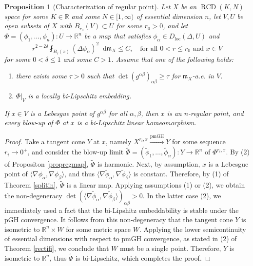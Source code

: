\documentclass[11pt,reqno]{amsart}
\newtheorem{proposition}[theorem]{Proposition}
\theoremstyle{definition}
\numberwithin{equation}{section}
\newcommand{\di}{\mathop{}\!\mathrm{d}}
\newcommand{\meas}{\mathfrak{m}}
\DeclareMathOperator{\loc}{loc}
\DeclareMathOperator{\RCD}{RCD}
\begin{document}
\begin{proposition}[Characterization of regular point]\label{regularpointch}
Let $X$ be an $\RCD(K, N)$ space for some $K \in \mathbb{R}$ and some $N \in [1,\infty)$ of essential dimension $n$, let $V, U$ be open subsets of $X$ with $B_{r_0}(V) \subset U$ for some $r_0>0$, 
and let $\Phi=(\phi_1, \ldots, \phi_n):U \to \mathbb{R}^n$ be a map that satisfies $\phi_{\alpha} \in D_{\loc}(\Delta, U)$  and  
\begin{equation}
    r^{2-2\delta}\fint_{B_r(x)}(\Delta \phi_{\alpha})^2\di \meas_X\le C,\quad \text{for all $0<r\le r_0$ and $x \in V$}
\end{equation}
for some $0<\delta \le 1$ and some $C>1$.
Assume that one of the following holds:
\begin{enumerate}
    \item there exists some $\tau > 0$ such that
    $
    \det(g^{\alpha \beta})_{\alpha \beta}  \ge \tau$ for $\meas_X$-a.e. in $V$.
 \item $\Phi|_V$ is a locally bi-Lipschitz embedding.
\end{enumerate}
If $x \in V$ is a Lebesgue point of $g^{\alpha \beta}$ for all $\alpha, \beta$, then $x$ is an $n$-regular point, and every blow-up of $\Phi$ at $x$ is a bi-Lipschitz linear homeomorphism.
\end{proposition}
\begin{proof}
Take a tangent cone $Y$ at $x$, namely
$
    X^{r_i, x} \xrightarrow{\mathrm{pmGH}} Y$ for some sequence $r_i \to 0^+$,
and consider the blow-up limit $\tilde \Phi=(\tilde \phi_1, \ldots, \tilde \phi_n):Y \to \mathbb{R}^n$ of $\Phi^{r_i, x}$.  By (2) of Propositon \ref{propregmap}, $\widetilde{\Phi}$
is harmonic.
Next, by assumption, $x$ is a Lebesgue point of $\langle \nabla \phi_{\alpha}, \nabla \phi_{\beta} \rangle$, and thus $\langle \nabla \tilde \phi_{\alpha}, \nabla \tilde \phi_{\beta}\rangle$ is constant. 
 Therefore, by (1) of Theorem \ref{splitin}, $\widetilde{\Phi}$ is a linear map. 
 Applying assumptions (1) or (2), we obtain the non-degeneracy
 $\det (\langle \nabla \tilde \phi_{\alpha}, \nabla \tilde \phi_{\beta}\rangle)_{\alpha \beta} > 0$.
In the latter case (2), we immediately used a fact that the bi-Lipshitz embeddability is stable under the pGH convergence.
 It follows from this non-degeneracy that the tangent cone $Y$ is isometric to $\mathbb{R}^n\times W$ for some metric space $W$.   Applying
the lower semicontinuity of essential dimensions with respect to pmGH convergence, as stated in (2) of Theorem \ref{rectifi}, we conclude that $W$ must be a single point. Therefore, $Y$ is isometric to $\mathbb{R}^n$, thus $\widetilde{\Phi}$ is bi-Lipschitz, which completes the proof. 
\end{proof}
\end{document}
